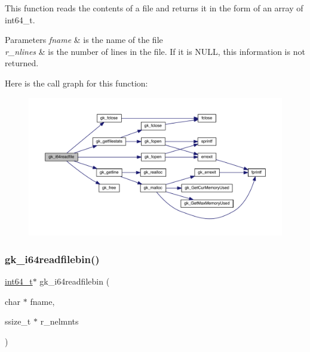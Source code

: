 This function reads the contents of a file and returns it in the form of an array of int64\+\_\+t. 
\begin{DoxyParams}{Parameters}
{\em fname} & is the name of the file \\
\hline
{\em r\+\_\+nlines} & is the number of lines in the file. If it is N\+U\+LL, this information is not returned. \\
\hline
\end{DoxyParams}
Here is the call graph for this function\+:\nopagebreak
\begin{figure}[H]
\begin{center}
\leavevmode
\includegraphics[width=350pt]{a00077_a8cb19aa95a831aa745f6e04e1cc0b204_cgraph}
\end{center}
\end{figure}
\mbox{\label{a00077_aca460764497638a612f886a089662416}} 
\subsubsection{\texorpdfstring{gk\+\_\+i64readfilebin()}{gk\_i64readfilebin()}}
{\footnotesize\ttfamily \hyperlink{a00119_a67a9885ef4908cb72ce26d75b694386c}{int64\+\_\+t}$\ast$ gk\+\_\+i64readfilebin (\begin{DoxyParamCaption}\item[{char $\ast$}]{fname,  }\item[{ssize\+\_\+t $\ast$}]{r\+\_\+nelmnts }\end{DoxyParamCaption})}

